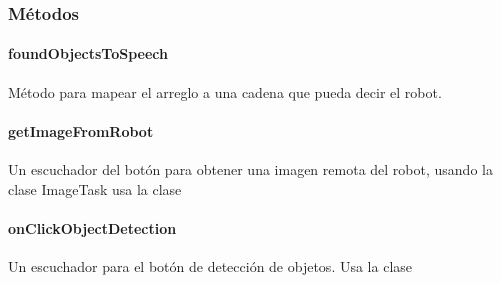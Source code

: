 \subsubsection{Métodos}
\label{\detokenize{dev_docs:id29}}

\paragraph{foundObjectsToSpeech}
\label{\detokenize{dev_docs:foundobjectstospeech}}

\begin{fulllineitems}
\label{\detokenize{dev_docs:com.lar.cloudnao.ObjectDetectionActivity.foundObjectsToSpeech()}}
Método para mapear el arreglo  a una cadena que pueda decir el robot.

\end{fulllineitems}



\paragraph{getImageFromRobot}
\label{\detokenize{dev_docs:id30}}

\begin{fulllineitems}
\label{\detokenize{dev_docs:com.lar.cloudnao.ObjectDetectionActivity.getImageFromRobot()}}
Un escuchador del botón para obtener una imagen remota del robot, usando la clase ImageTask usa la clase 

\end{fulllineitems}



\paragraph{onClickObjectDetection}
\label{\detokenize{dev_docs:onclickobjectdetection}}

\begin{fulllineitems}
\label{\detokenize{dev_docs:com.lar.cloudnao.ObjectDetectionActivity.onClickObjectDetection()}}
Un escuchador para el botón de detección de objetos. Usa la clase 

\end{fulllineitems}



